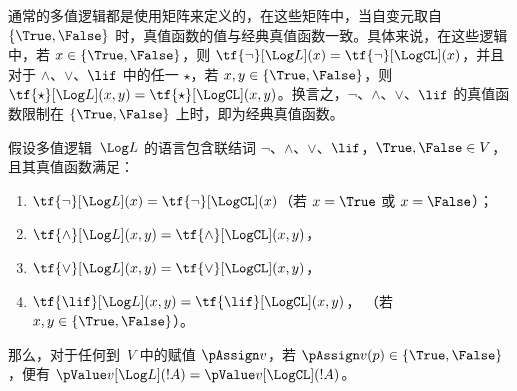\documentclass[../../../include/open-logic-section]{subfiles}
\begin{document}


通常的多值逻辑都是使用矩阵来定义的，在这些矩阵中，当自变元取自 $\{\True, \False\}$ 时，真值函数的值与经典真值函数一致。具体来说，在这些逻辑中，若 $x \in \{\True, \False\}$，则 $\tf{\lnot}[\Log L](x) =
\tf{\lnot}[\LogCL](x)$，并且对于 $\land$、$\lor$、$\lif$ 中的任一 $\star$，若 $x, y \in \{\True, \False\}$，则 $\tf{\star}[\Log L](x,y) =
\tf{\star}[\LogCL](x,y)$。换言之，$\lnot$、$\land$、$\lor$、$\lif$ 的真值函数限制在 $\{\True,\False\}$ 上时，即为经典真值函数。

\begin{prop}
  假设多值逻辑~$\Log L$ 的语言包含联结词
  $\lnot$、$\land$、$\lor$、$\lif$，$\True, \False \in
  V$，且其真值函数满足：
  \begin{enumerate}
    \item{} $\tf{\lnot}[\Log L](x) = \tf{\lnot}[\LogCL](x)$（若 $x =
    \True$ 或 $x = \False$）；
    \item{} $\tf{\land}[\Log L](x,y) = \tf{\land}[\LogCL](x,y)$，
    \item{} $\tf{\lor}[\Log L](x,y) = \tf{\lor}[\LogCL](x,y)$，
    \item{} $\tf{\lif}[\Log L](x,y) = \tf{\lif}[\LogCL](x,y)$，
    （若 $x, y \in \{\True, \False\}$）。
  \end{enumerate}
  那么，对于任何到~$V$ 中的赋值 $\pAssign v$，若 $\pAssign
  v(p) \in \{\True,\False\}$，便有 $\pValue v[\Log L](!A) = \pValue
  v[\LogCL](!A)$。
\end{prop}
\end{document}

